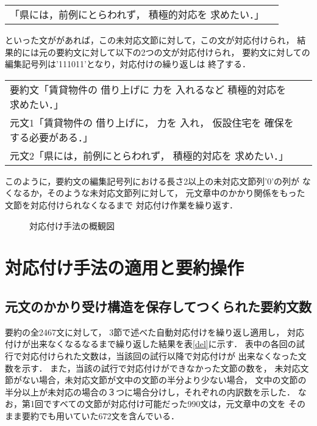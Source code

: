 \begin{center}
\small
\begin{tabular}{lp{}}
「県には，前例にとらわれず， 積極的対応を 求めたい．」
\end{tabular}
\end{center}

といった文ががあれば，この未対応文節に対して，この文が対応付けられ，
結果的には元の要約文に対して以下の2つの文が対応付けられ，
要約文に対しての編集記号列は'111011'となり，対応付けの繰り返しは
終了する．

\begin{center}
\small
\begin{tabular}{lp{}}
要約文「賃貸物件の 借り上げに 力を 入れるなど 積極的対応を 求めたい．」\\ 
元文1「賃貸物件の 借り上げに， 力を 入れ， 仮設住宅を  確保を する必要がある．」
\\
元文2「県には，前例にとらわれず， 積極的対応を 求めたい．」\\
\end{tabular}
\end{center}

このように，要約文の編集記号列における長さ2以上の未対応文節列'0'の列が
なくなるか，そのような未対応文節列に対して，
元文章中のかかり関係をもった文節を対応付けられなくなるまで
対応付け作業を繰り返す．

\begin{figure}[htbp]
\begin{center}
\caption{対応付け手法の概観図}
\label{loop}
\end{center}
\end{figure}

\section{対応付け手法の適用と要約操作}

\subsection{元文のかかり受け構造を保存してつくられた要約文数}

要約の全2467文に対して，
3節で述べた自動対応付けを繰り返し適用し，
対応付けが出来なくなるなるまで繰り返した結果を表\ref{del}に示す．
表中の各回の試行で対応付けられた文数は，当該回の試行以降で対応付けが
出来なくなった文数を示す．
また，当該の試行で対応付けができなかった文節の数を，
未対応文節がない場合，未対応文節が文中の文節の半分より少ない場合，
文中の文節の半分以上が未対応の場合の３つに場合分けし，それぞれの内訳数を示した．
なお，第1回ですべての文節が対応付け可能だった990文は，元文章中の文を
そのまま要約でも用いていた672文を含んでいる．

